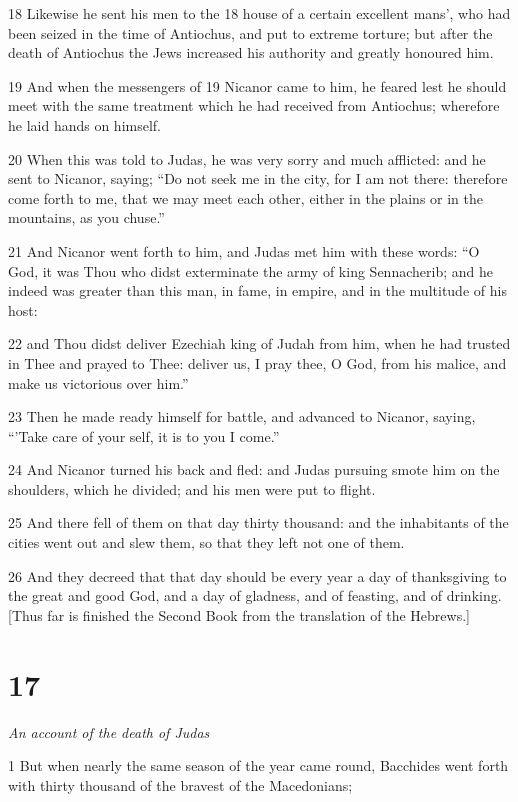 18 Likewise he sent his men to the 18 house of a certain excellent mans’, who had been seized in the time of Antiochus, and put to extreme torture; but after the death of Antiochus the Jews increased his authority and greatly honoured him. 

19 And when the messengers of 19 Nicanor came to him, he feared lest he should meet with the same treatment which he had received from Antiochus; wherefore he laid hands on himself. 

20 When this was told to Judas, he was very sorry and much afflicted: and he sent to Nicanor, saying; “Do not seek me in the city, for I am not there: therefore come forth to me, that we may meet each other, either in the plains or in the mountains, as you chuse.” 

21 And Nicanor went forth to him, and Judas met him with these words: “O God, it was Thou who didst exterminate the army of king Sennacherib; and he indeed was greater than this man, in fame, in empire, and in the multitude of his host: 

22 and Thou didst deliver Ezechiah king of Judah from him, when he had trusted in Thee and prayed to Thee: deliver us, I pray thee, O God, from his malice, and make us victorious over him.” 

23 Then he made ready himself for battle, and advanced to Nicanor, saying, “'Take care of your self, it is to you I come.” 

24 And Nicanor turned his back and fled: and Judas pursuing smote him on the shoulders, which he divided; and his men were put to flight. 

25 And there fell of them on that day thirty thousand: and the inhabitants of the cities went out and slew them, so that they left not one of them.

26 And they decreed that that day should be every year a day of thanksgiving to the great and good God, and a day of gladness, and of feasting, and of drinking. [Thus far is finished the Second Book from the translation of the Hebrews.] 

\chapter{17}

\par \textit{An account of the death of Judas}

1 But when nearly the same season of the year came round, Bacchides went forth with thirty thousand of the bravest of the Macedonians; 

